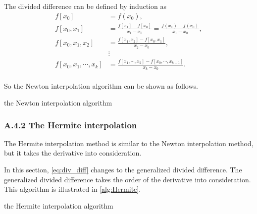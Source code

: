 \documentclass[a4paper]{article}
\begin{document}
The divided difference can be defined by induction as 
\begin{equation}
    \begin{aligned}
        f[x_0] & = f(x_0), \\
        f[x_0, x_1] & = \frac{f[x_1] - f[x_0]}{x_1 - x_0} = \frac{f(x_1) - f(x_0)}{x_1 - x_0}, \\ 
        f[x_0, x_1, x_2] & = \frac{f[x_1, x_2] - f[x_0, x_1]}{x_2 - x_0}, \\
        & \vdots \\
        f[x_0, x_1, \cdots, x_k] & = \frac{f[x_1, \cdots, x_k] - f[x_0, \cdots, x_{k-1}]}{x_k - x_0}. \\
    \end{aligned}
    \label{eq:div_diff}
\end{equation}

So the Newton interpolation algorithm can be shown as follows.

\begin{algorithm}[H]
    \BlankLine
    \caption{the Newton interpolation algorithm}
    \label{alg:Newton}
\end{algorithm}

\subsubsection*{A.4.2 The Hermite interpolation}

The Hermite interpolation method is similar to the Newton interpolation method, but it takes the derivative into consideration.

In this section, \cref{eq:div_diff} changes to the generalized divided difference. 
The generalized divided difference takes the order of the derivative into consideration. This algorithm is illustrated in \cref{alg:Hermite}.

\begin{algorithm}[H]
    \BlankLine
    \caption{the Hermite interpolation algorithm}
    \label{alg:Hermite}
\end{algorithm}
\end{document}
